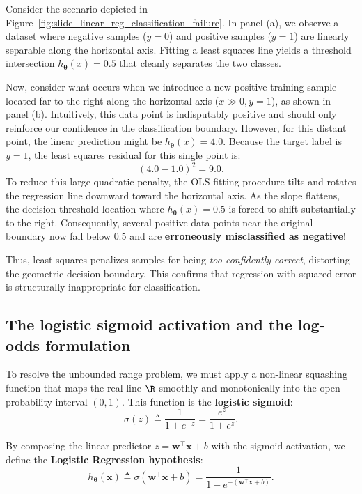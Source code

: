 Consider the scenario depicted in Figure~\ref{fig:slide_linear_reg_classification_failure}. In panel (a), we observe a dataset where negative samples ($y=0$) and positive samples ($y=1$) are linearly separable along the horizontal axis. Fitting a least squares line yields a threshold intersection $h_{\boldsymbol{\theta}}(x) = 0.5$ that cleanly separates the two classes.

Now, consider what occurs when we introduce a new positive training sample located far to the right along the horizontal axis ($x \gg 0, y=1$), as shown in panel (b). Intuitively, this data point is indisputably positive and should only reinforce our confidence in the classification boundary. However, for this distant point, the linear prediction might be $h_{\boldsymbol{\theta}}(x) = 4.0$. Because the target label is $y = 1$, the least squares residual for this single point is:
\begin{equation}
(4.0 - 1.0)^2 = 9.0.
\end{equation}
To reduce this large quadratic penalty, the OLS fitting procedure tilts and rotates the regression line downward toward the horizontal axis. As the slope flattens, the decision threshold location where $h_{\boldsymbol{\theta}}(x) = 0.5$ is forced to shift substantially to the right. Consequently, several positive data points near the original boundary now fall below $0.5$ and are \textbf{erroneously misclassified as negative}!

Thus, least squares penalizes samples for being \textit{too confidently correct}, distorting the geometric decision boundary. This confirms that regression with squared error is structurally inappropriate for classification.

\subsection{The logistic sigmoid activation and the log-odds formulation}
\label{sec:logistic_sigmoid_formulation}

To resolve the unbounded range problem, we must apply a non-linear squashing function that maps the real line $\R$ smoothly and monotonically into the open probability interval $(0, 1)$. This function is the \textbf{logistic sigmoid}:
\begin{equation}
\sigma(z) \triangleq \frac{1}{1 + e^{-z}} = \frac{e^z}{1 + e^z}.
\label{eq:sigmoid_def}
\end{equation}

By composing the linear predictor $z = \mathbf{w}^\top \mathbf{x} + b$ with the sigmoid activation, we define the \textbf{Logistic Regression hypothesis}:
\begin{equation}
h_{\boldsymbol{\theta}}(\mathbf{x}) \triangleq \sigma(\mathbf{w}^\top \mathbf{x} + b) = \frac{1}{1 + e^{-(\mathbf{w}^\top \mathbf{x} + b)}}.
\label{eq:logistic_regression_hypothesis}
\end{equation}

